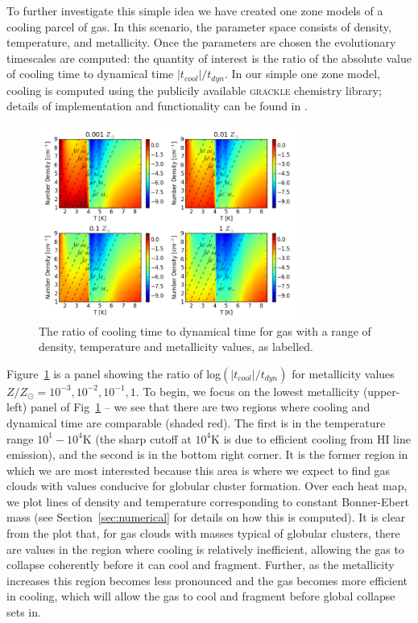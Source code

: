 \documentclass[useAMS,usenatbib]{mn2e}
\begin{document}
To further investigate this simple idea we have created one zone models of a cooling parcel of gas. In  this scenario, the parameter space consists of density, temperature, and metallicity. Once the parameters are chosen the evolutionary timescales are computed: the quantity of interest is the ratio of the absolute value of cooling time to dynamical time $|t_{cool}|/t_{dyn}$. In our simple one zone model, cooling is computed using the publicily available \textsc{grackle} chemistry library; details of implementation and functionality can be found
in \cite{Bryan2014}.
\begin{figure}
\begin{center}
\mbox{\includegraphics[width=8.5cm]{Images/cooling_to_freefall_no_background}}
\end{center}
\caption{\label{fig:cooling_to_freefall} The ratio of cooling time to dynamical time for gas with a range of density, temperature and metallicity values, as labelled.}
\end{figure}

Figure~\ref{fig:cooling_to_freefall} is a panel showing the ratio of log$(|t_{cool}|/t_{dyn})$ for metallicity values $Z/Z_{\odot}=10^{-3},10^{-2},10^{-1},1$.  To begin, we focus on the lowest metallicity  (upper-left) panel of Fig~\ref{fig:cooling_to_freefall} -- we see that there are two regions where cooling and dynamical time are comparable (shaded red). The first is in the temperature range $10^1-10^4$K (the sharp cutoff at $10^4$K is due to efficient cooling from HI line emission), and the second is in the bottom right corner. It is the former region in which we are most interested because this area is where we expect to find gas clouds with values conducive for globular cluster formation. Over each heat map, we plot lines of density and temperature corresponding to constant Bonner-Ebert mass (see Section~\ref{sec:numerical} for details on how this is computed). It is clear from the plot that, for gas clouds with masses typical of globular clusters, there are values in the region where cooling is relatively inefficient, allowing the gas to collapse coherently before it can cool and fragment. Further, as the metallicity increases this region becomes less pronounced and the gas becomes more efficient in cooling, which will allow the gas to cool and fragment before global collapse sets in.
\end{document}
